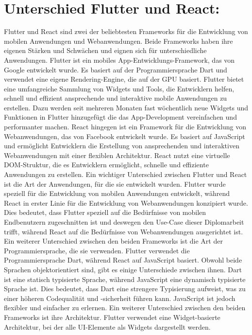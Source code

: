 \section{Unterschied Flutter und React:}
Flutter und React sind zwei der beliebtesten Frameworks für die Entwicklung von mobilen Anwendungen und Webanwendungen. 
Beide Frameworks haben ihre eigenen Stärken und Schwächen und eignen sich für unterschiedliche Anwendungen. 
Flutter ist ein mobiles App-Entwicklungs-Framework, das von Google entwickelt wurde. 
Es basiert auf der Programmiersprache Dart und verwendet eine eigene Rendering-Engine, die auf der GPU basiert. 
Flutter bietet eine umfangreiche Sammlung von Widgets und Tools, die Entwicklern helfen, schnell und effizient ansprechende und interaktive mobile Anwendungen zu erstellen. 
Dazu werden seit mehreren Monaten fast wöchentlich neue Widgets und Funktionen in Flutter hinzugefügt die das App-Development vereinfachen und performanter machen. 
React hingegen ist ein Framework für die Entwicklung von Webanwendungen, das von Facebook entwickelt wurde. Es basiert auf JavaScript und ermöglicht Entwicklern die Erstellung von ansprechenden und interaktiven \newline 
Webanwendungen mit einer flexiblen Architektur. 
React nutzt eine virtuelle DOM-Struktur, die es Entwicklern ermöglicht, schnelle und effiziente Anwendungen zu erstellen. 
Ein wichtiger Unterschied zwischen Flutter und React ist die Art der Anwendungen, für die sie entwickelt wurden. 
Flutter wurde speziell für die Entwicklung von mobilen Anwendungen entwickelt, während React in erster Linie für die Entwicklung von Webanwendungen konzipiert wurde. 
Dies bedeutet, dass Flutter speziell auf die Bedürfnisse von mobilen Endbenutzern zugeschnitten ist und deswegen den Use-Case dieser Diplomarbeit trifft, während React auf die Bedürfnisse von Webanwendungen ausgerichtet ist.
Ein weiterer Unterschied zwischen den beiden Frameworks ist die Art der Programmiersprache, die sie verwenden. 
Flutter verwendet die Programmiersprache Dart, während React auf JavaScript basiert. 
Obwohl beide Sprachen objektorientiert sind, gibt es einige Unterschiede zwischen ihnen. Dart ist eine statisch typisierte Sprache, während JavaScript eine dynamisch typisierte Sprache ist. 
Dies bedeutet, dass Dart eine strengere Typisierung aufweist, was zu einer höheren Codequalität und -sicherheit führen kann. 
JavaScript ist jedoch flexibler und einfacher zu erlernen.
Ein weiterer Unterschied zwischen den beiden Frameworks ist ihre Architektur. 
Flutter verwendet eine Widget-basierte Architektur, bei der alle UI-Elemente als Widgets dargestellt werden. 
